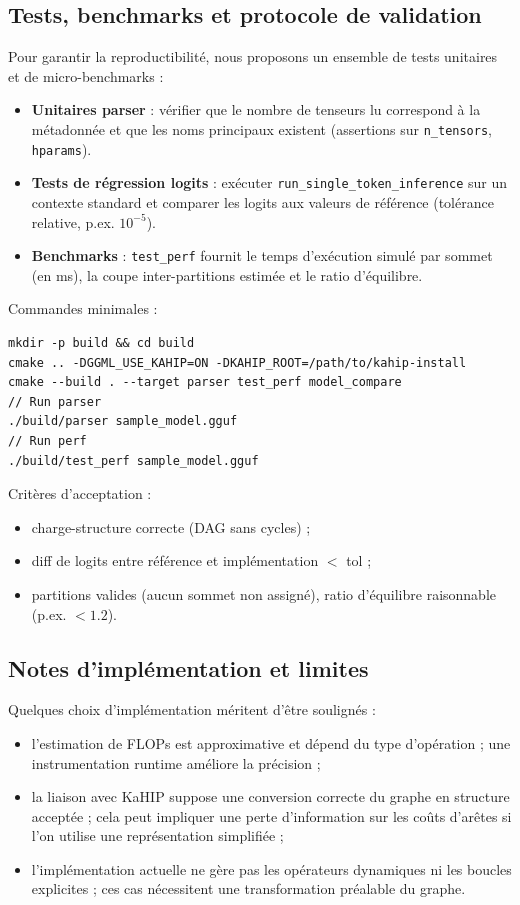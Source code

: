 \documentclass[11pt,a4paper]{article}
\begin{document}
\subsection{Tests, benchmarks et protocole de validation}

Pour garantir la reproductibilit\'e, nous proposons un ensemble de tests unitaires et de micro-benchmarks :

\begin{itemize}[leftmargin=*]
	\item \textbf{Unitaires parser} : v\'erifier que le nombre de tenseurs lu correspond \`a la m\'etadonn\'ee et que les noms principaux existent (assertions sur \texttt{n\_tensors}, \texttt{hparams}).
	\item \textbf{Tests de r\'egression logits} : ex\'ecuter \texttt{run\_single\_token\_inference} sur un contexte standard et comparer les logits aux valeurs de r\'ef\'erence (tol\'erance relative, p.ex. $10^{-5}$).
	\item \textbf{Benchmarks} : \texttt{test\_perf} fournit le temps d'ex\'ecution simul\'e par sommet (en ms), la coupe inter-partitions estim\'ee et le ratio d'\'equilibre.
\end{itemize}

Commandes minimales :
\begin{verbatim}
mkdir -p build && cd build
cmake .. -DGGML_USE_KAHIP=ON -DKAHIP_ROOT=/path/to/kahip-install
cmake --build . --target parser test_perf model_compare
// Run parser
./build/parser sample_model.gguf
// Run perf
./build/test_perf sample_model.gguf
\end{verbatim}

Crit\`eres d'acceptation :
\begin{itemize}[leftmargin=*]
	\item charge-structure correcte (DAG sans cycles) ;
	\item diff de logits entre r\'ef\'erence et impl\'ementation $<$ tol ;
	\item partitions valides (aucun sommet non assign\'e), ratio d'\'equilibre raisonnable (p.ex. $<1.2$).
\end{itemize}

\subsection{Notes d'impl\'ementation et limites}

Quelques choix d'impl\'ementation m\'eritent d'\^etre soulign\'es :
\begin{itemize}[leftmargin=*]
	\item l'estimation de FLOPs est approximative et d\'epend du type d'op\'eration ; une instrumentation runtime am\'eliore la pr\'ecision ;
	\item la liaison avec KaHIP suppose une conversion correcte du graphe en structure accept\'ee ; cela peut impliquer une perte d'information sur les co\^uts d'ar\^etes si l'on utilise une repr\'esentation simplifi\'ee ;
	\item l'impl\'ementation actuelle ne g\`ere pas les op\'erateurs dynamiques ni les boucles explicites ; ces cas n\'ecessitent une transformation pr\'ealable du graphe.
\end{itemize}
 
\end{document}
